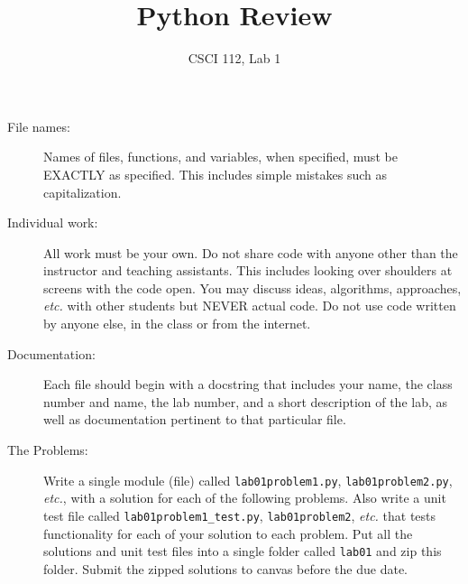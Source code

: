 \documentclass{article}
\title{Python Review}
\author{CSCI 112, Lab 1}
\date{}
\begin{document}
\sloppy

\maketitle

\begin{description} 
\item[File names:]  Names of files, functions, and variables, 
when specified,
must be EXACTLY as specified.  This includes simple mistakes such
as capitalization.

\item[Individual work:]  All work must be your own.  Do not share
code with anyone other than the instructor and teaching assistants.
This includes looking over shoulders at screens with the code open.
You may discuss ideas, algorithms, approaches, {\em etc.} with
other students but NEVER actual code.  Do not use code
written by anyone else, in the class or from the internet.

\item[Documentation:] Each file should begin with a docstring
that includes your name, the class number and name, the lab
number, and  
a short description of the lab, as well as documentation pertinent
to that particular file.

\item[The Problems:]  Write a single module (file) called {\tt lab01problem1.py},
{\tt lab01problem2.py}, {\em etc.},
with a solution for each of the following problems.  Also write a unit test
file called {\tt lab01problem1\_test.py}, {\tt lab01problem2}, {\em etc.}
 that tests functionality for each of your solution to each problem.
Put all the solutions and unit test files 
into a single folder called {\tt lab01} and zip this folder.
Submit the zipped solutions to canvas before the due date.

\end{description}
\end{document}
